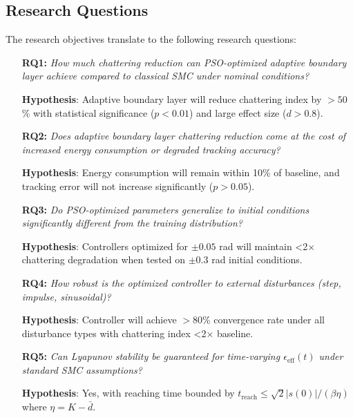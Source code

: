 \subsection{Research Questions}

The research objectives translate to the following research questions:

\begin{enumerate}
    \item[\textbf{RQ1:}] \textit{How much chattering reduction can PSO-optimized adaptive boundary layer achieve compared to classical SMC under nominal conditions?}

    \textbf{Hypothesis}: Adaptive boundary layer will reduce chattering index by $>50$\% with statistical significance ($p<0.01$) and large effect size ($d>0.8$).

    \item[\textbf{RQ2:}] \textit{Does adaptive boundary layer chattering reduction come at the cost of increased energy consumption or degraded tracking accuracy?}

    \textbf{Hypothesis}: Energy consumption will remain within 10\% of baseline, and tracking error will not increase significantly ($p>0.05$).

    \item[\textbf{RQ3:}] \textit{Do PSO-optimized parameters generalize to initial conditions significantly different from the training distribution?}

    \textbf{Hypothesis}: Controllers optimized for $\pm0.05$ rad will maintain <2$\times$ chattering degradation when tested on $\pm0.3$ rad initial conditions.

    \item[\textbf{RQ4:}] \textit{How robust is the optimized controller to external disturbances (step, impulse, sinusoidal)?}

    \textbf{Hypothesis}: Controller will achieve $>80$\% convergence rate under all disturbance types with chattering index <2$\times$ baseline.

    \item[\textbf{RQ5:}] \textit{Can Lyapunov stability be guaranteed for time-varying $\epsilon_{\text{eff}}(t)$ under standard SMC assumptions?}

    \textbf{Hypothesis}: Yes, with reaching time bounded by $t_{\text{reach}} \leq \sqrt{2}|s(0)|/(\beta\eta)$ where $\eta = K - \bar{d}$.
\end{enumerate}

